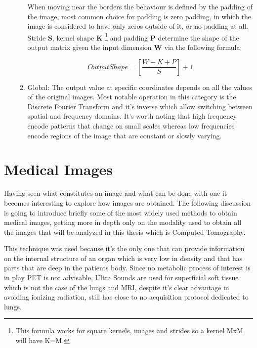 \begin{enumerate}
\begin{enumerate}
When moving near the borders the behaviour is defined by the padding of the image, most common choice for padding is zero padding, in which the image is considered to have only zeros outside of it, or no padding at all. 
Stride \textbf{S}, kernel shape \textbf{K}
\footnote{This formula works for square kernels, images and strides so a kernel MxM will have K=M.}
 and padding \textbf{P} determine the shape of the output matrix given the input dimension \textbf{W} via the following formula:

\begin{equation}
Output Shape =\left[ \frac{W - K + P}{S}\right]+1
\end{equation}

		\item Global: The output value at specific coordinates depends on all the values of the original images. Most notable operation in this category is the Discrete Fourier Transform and it's inverse which allow switching between spatial and frequency domains. It's worth noting that high frequency encode patterns that change on small scales whereas low frequencies encode regions of the image that are constant or slowly varying.
		\end{enumerate}
\end{enumerate}

\section{Medical Images}
Having seen what constitutes an image and what can be done with one it becomes interesting to explore how images are obtained. The following discussion is going to introduce briefly some of the most widely used methods to obtain medical images, getting more in depth only on the modality used to obtain all the images that will be analyzed in this thesis which is Computed Tomography.

This technique was used because it's the only one that can provide information on the internal structure of an organ which is very low in density and that has parts that are deep in the patients body. Since no metabolic process of interest is in play PET is not advisable, Ultra Sounds are used for superficial soft tissue which is not the case of the lungs and MRI, despite it's clear advantage in avoiding ionizing radiation, still has close to no acquisition protocol dedicated to lungs.

